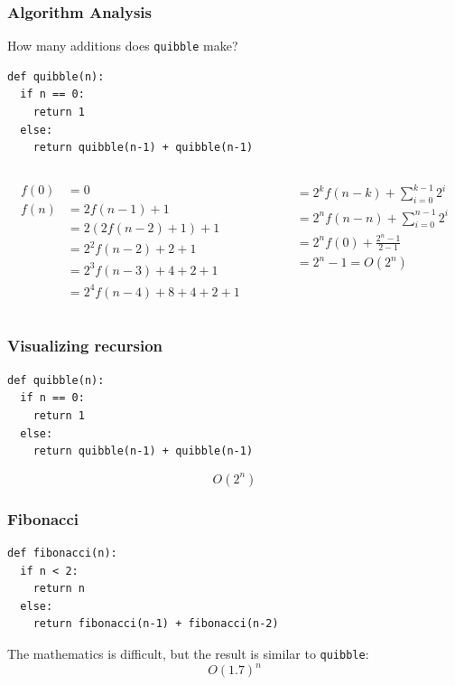 \documentclass{beamer}
\newcommand{\bfr}[1]{\begin{frame}[fragile]\frametitle{{ #1 }}}
\newcommand{\cola}{\begin{columns}\begin{column}{0.5\textwidth}}
\newcommand{\colb}{\end{column}\begin{column}{0.5\textwidth}}
\newcommand{\colc}{\end{column}\end{columns}}
\begin{document}
\bfr{Algorithm Analysis}
How many additions does {\tt quibble} make?
\begin{lstlisting}
def quibble(n):
  if n == 0:
    return 1
  else:
    return quibble(n-1) + quibble(n-1)
\end{lstlisting}
\cola
\begin{align*}
f(0) &= 0\\
f(n) &= 2f(n-1) + 1\\
     &= 2(2f(n-2) + 1) + 1\\
     &= 2^2f(n-2) + 2 + 1\\
     &= 2^3f(n-3) + 4 + 2 + 1\\
     &= 2^4f(n-4) + 8 + 4 + 2 + 1
\end{align*}
\colb\pause
\begin{align*}
     &= 2^kf(n-k) + \sum_{i=0}^{k-1} 2^i\\
     &= 2^nf(n-n) + \sum_{i=0}^{n-1} 2^i\\
     &= 2^nf(0) + \frac{2^n-1}{2-1}\\
     &= 2^n-1 = O(2^n)
\end{align*}
\colc
\end{frame}

\bfr{Visualizing recursion}

\begin{lstlisting}
def quibble(n):
  if n == 0:
    return 1
  else:
    return quibble(n-1) + quibble(n-1)
\end{lstlisting}
\[O(2^n)\]
\end{frame}

\bfr{Fibonacci}
\begin{lstlisting}
def fibonacci(n):
  if n < 2:
    return n
  else:
    return fibonacci(n-1) + fibonacci(n-2)
\end{lstlisting}
The mathematics is difficult, but the result is similar
to {\tt quibble}:
\[
 O(1.7)^n
\]
\end{frame}
\end{document}

